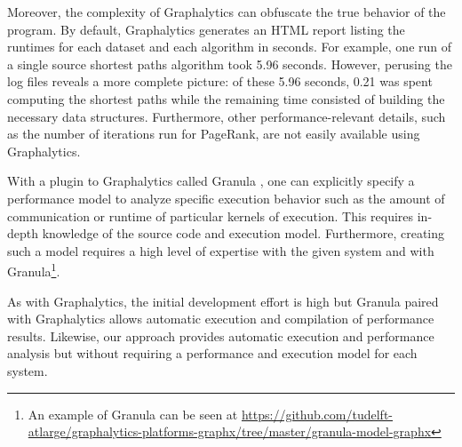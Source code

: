 \documentclass{llncs}
\begin{document}
Moreover, the complexity of Graphalytics can obfuscate the true behavior of the program. By default, Graphalytics generates an HTML report listing the runtimes for each dataset and each algorithm in seconds. For example, one run of a single source shortest paths algorithm took 5.96 seconds. However, perusing the log files reveals a more complete picture: of these 5.96 seconds, 0.21 was spent computing the shortest paths while the remaining time consisted of building the necessary data structures. Furthermore, other performance-relevant details, such as the number of iterations run for PageRank, are not easily available using Graphalytics.

With a plugin to Graphalytics called Granula \cite{Ngai:2015:Granula}, one can explicitly specify a performance model to analyze specific execution behavior such as the amount of communication or runtime of particular kernels of execution. This requires in-depth knowledge of the source code and execution model. Furthermore, creating such a model requires a high level of expertise with the given system and with Granula\footnote{An example of Granula can be seen at \url{https://github.com/tudelft-atlarge/graphalytics-platforms-graphx/tree/master/granula-model-graphx}}.

As with Graphalytics, the initial development effort is high but Granula paired with Graphalytics allows automatic execution and compilation of performance results. Likewise, our approach provides automatic execution and performance analysis but without requiring a performance and execution model for each system.
\end{document}
